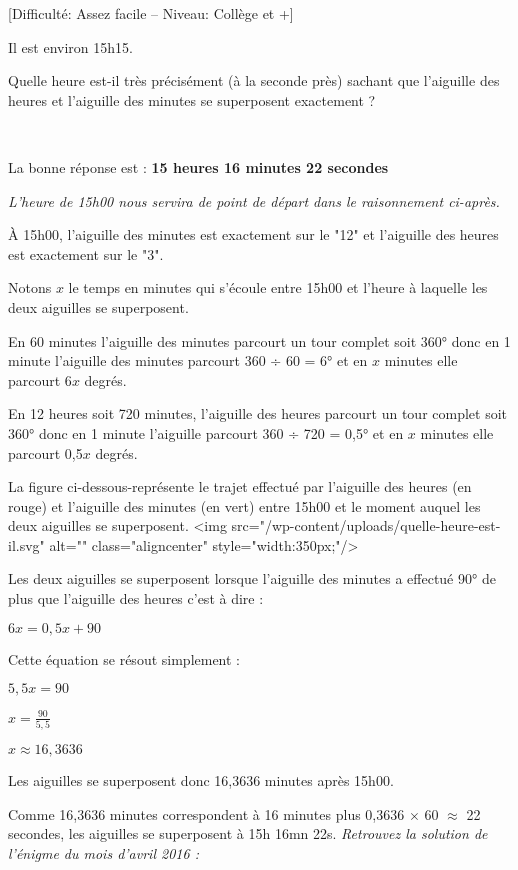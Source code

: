 
%

\begin{center}
\end{center}
[Difficulté: Assez facile – Niveau: Collège et +]

\par
Il est environ 15h15.
\par
Quelle heure est-il très précisément (à la seconde près) sachant que l'aiguille des heures et l'aiguille des minutes se superposent exactement ?
\par
~
\begin{note}La bonne réponse est : \textbf{15 heures 16 minutes 22 secondes}\end{note}
\textit{L'heure de 15h00 nous servira de point de départ dans le raisonnement ci-après.}
\par
À 15h00, l'aiguille des minutes est exactement sur le "12" et l'aiguille des heures est exactement sur le "3".
\par
Notons $x$ le temps en minutes qui s'écoule entre 15h00 et l'heure à laquelle les deux aiguilles se superposent.
\par
En  60 minutes l'aiguille des minutes parcourt un tour complet soit 360° donc en 1 minute l'aiguille des minutes parcourt  360 ÷ 60 = 6° et en $x$ minutes elle parcourt 6$x$ degrés.
\par
En 12 heures soit 720 minutes, l'aiguille des heures parcourt un tour complet soit 360° donc en 1 minute l'aiguille parcourt 360  ÷ 720 = 0,5° et en $x$ minutes elle parcourt 0,5$x$ degrés.
\par
La figure ci-dessous-représente le trajet effectué par l'aiguille des heures (en rouge) et l'aiguille des minutes (en vert) entre 15h00 et le moment auquel les deux aiguilles se superposent.
<img src="/wp-content/uploads/quelle-heure-est-il.svg" alt="" class="aligncenter" style="width:350px;"/>

\begin{center}
\end{center}
Les deux aiguilles se superposent lorsque l'aiguille des minutes a effectué 90° de plus que l'aiguille des heures c'est à dire :
\par
$6x=0,5x+90$
\par
Cette équation se résout simplement :
\par
$5,5x=90$
\par
$x=\frac{90}{5,5}$
\par
$x \approx 16,3636$
\par
Les aiguilles se superposent donc 16,3636 minutes après 15h00.
\par
Comme 16,3636 minutes correspondent à 16 minutes plus 0,3636 $\times$ 60 $\approx$ 22 secondes, les aiguilles se superposent à 15h 16mn 22s.
\textit{Retrouvez la solution de l'énigme du mois d'avril 2016 : }
